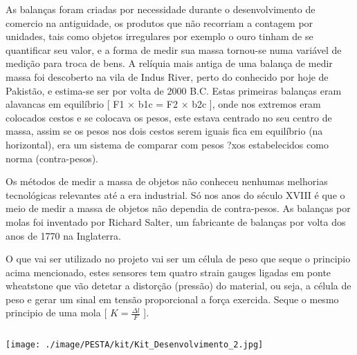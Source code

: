 
{
	As balanças foram criadas por necessidade durante o desenvolvimento de comercio na antiguidade, os produtos que não recorriam a contagem por unidades, tais como objetos irregulares por exemplo o ouro tinham de se quantificar seu valor, e a forma de medir sua massa tornou-se numa variável de medição para troca de bens. A relíquia mais antiga de uma balança de medir massa foi descoberto na vila de Indus River, perto do conhecido por hoje de Pakistão, e estima-se ser por volta de 2000 B.C.
	Estas primeiras balanças eram alavancas em equilíbrio [ F1 × b1c = F2 × b2c ], onde nos extremos eram colocados cestos e se colocava os pesos, este estava centrado no seu centro de massa, assim se os pesos nos dois cestos serem iguais fica em equilíbrio (na horizontal), era um sistema de comparar com pesos ?xos estabelecidos como norma (contra-pesos).
	
	Os métodos de medir a massa de objetos não conheceu nenhumas melhorias tecnológicas relevantes até a era industrial. Só nos anos do século XVIII é que o meio de medir a massa de objetos não dependia de contra-pesos. As balanças por molas foi inventado por Richard Salter, um fabricante de balanças por volta dos anos de 1770 na Inglaterra.
	
	O que vai ser utilizado no projeto vai ser um célula de peso que seque o principio acima mencionado, estes sensores tem quatro strain gauges ligadas em ponte wheatstone que vão detetar a distorção (pressão) do material, ou seja, a célula de peso e gerar um sinal em tensão proporcional a força exercida. Seque o mesmo principio de uma mola [ $K= \frac{\Delta l}{F}$ ].
}
\begin{columns}
	
\end{columns}

\begin{columns}
	{
		\begin{tikzfigure}
			\texttt{[image: ./image/PESTA/kit/Kit\_Desenvolvimento\_2.jpg]}
		\end{tikzfigure}
	}
\end{columns}

